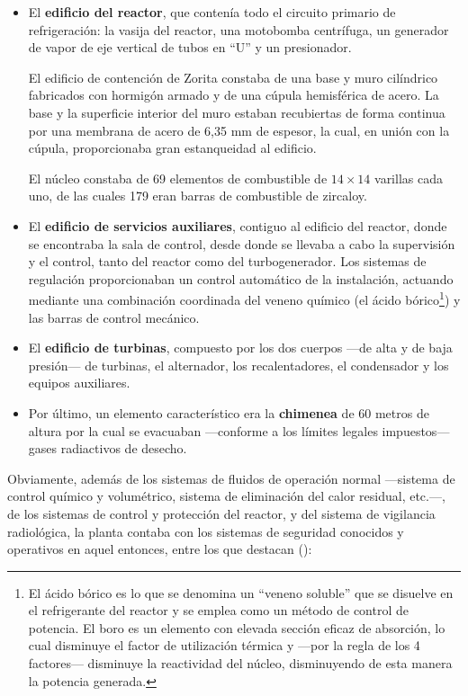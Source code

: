 \begin{itemize}
  \item El \textbf{edificio del reactor}, que contenía todo el circuito primario de refrigeración: la vasija del reactor, una motobomba centrífuga, un generador de vapor de eje vertical de tubos en ``U'' y un presionador.
  
  El edificio de contención de Zorita constaba de una base y muro cilíndrico fabricados con hormigón armado y de una cúpula hemisférica de acero. La base y la superficie interior del muro estaban recubiertas de forma continua por una membrana de acero de 6,35 mm de espesor, la cual, en unión con la cúpula, proporcionaba gran estanqueidad al edificio. 

  El núcleo constaba de 69 elementos de combustible de $14 \times 14$ varillas cada uno, de las cuales 179 eran barras de combustible de zircaloy.

  \item El \textbf{edificio de servicios auxiliares}, contiguo al edificio del reactor, donde se encontraba la sala de control, desde donde se llevaba a cabo la supervisión y el control, tanto del reactor como del turbogenerador. Los sistemas de regulación proporcionaban un control automático de la instalación, actuando mediante una combinación coordinada del veneno químico (el ácido bórico\footnote{El ácido bórico es lo que se denomina un ``veneno soluble'' que se disuelve en el refrigerante del reactor y se emplea como un método de control de potencia. El boro es un elemento con elevada sección eficaz de absorción, lo cual disminuye el factor de utilización térmica y ---por la regla de los 4 factores--- disminuye la \gls{reactividad} del núcleo, disminuyendo de esta manera la potencia generada.}) y las barras de control mecánico.

  \item El \textbf{edificio de turbinas}, compuesto por los dos cuerpos ---de alta y de baja presión--- de turbinas,  el alternador, los recalentadores, el condensador y los equipos auxiliares.
  
  \item Por último, un elemento característico era la \textbf{chimenea} de 60 metros de altura por la cual se evacuaban ---conforme a los límites legales impuestos--- gases radiactivos de desecho.
\end{itemize}

Obviamente, además de los sistemas de fluidos de operación normal ---sistema de control químico y volumétrico, sistema de eliminación del calor residual, etc.---, de los sistemas de control y protección del reactor, y del sistema de vigilancia radiológica, la planta contaba con los sistemas de seguridad conocidos y operativos en aquel entonces, entre los que destacan (\cite{documentacion_sgiz}):

